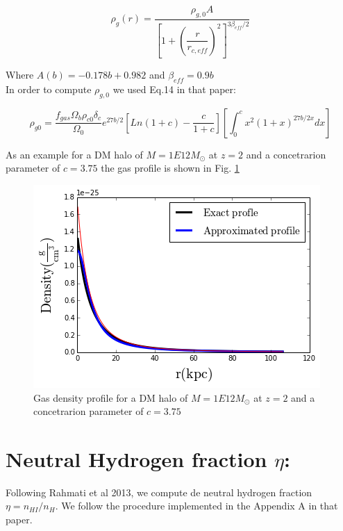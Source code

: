 \documentclass[12pt]{article}
\begin{document}
\begin{equation}\label{eq:rhogr}
\rho_g(r) =  \dfrac{\rho_{g,0}A}{\left[ 1 + \left(\dfrac{r}{r_{c,eff}}\right)^2 \right]^{3\beta_{eff}/2}}
\end{equation}

Where $A(b) = -0.178b + 0.982$ and $\beta_{eff} = 0.9 b$\\

In order to compute $\rho_{g,0}$ we used Eq.14 in that paper:

\begin{equation}\label{eq:rhog0}
\rho_{g0} = \dfrac{f_{gas}\Omega_{b}\rho_{c0}\delta_{c}}{\Omega_0}e^{27b/2} \left [ Ln(1+c) - \dfrac{c}{1+c}  \right ] \left [ \int_0^c x^2(1+x)^{27b/2x} dx \right ]
\end{equation}

As an example for a DM  halo of $M = 1E12 M_{\odot}$ at $z=2$ and a concetrarion parameter of $c=3.75$
the gas profile is shown in Fig. \ref{fig:gp}

\begin{figure}\label{fig:gp}
\centering
\includegraphics[scale=0.7]{../code/gasprofile.png}
\caption{Gas density profile for a DM  halo of $M = 1E12 M_{\odot}$ at $z=2$ and a concetrarion parameter of $c=3.75$}
\end{figure} 

\section{Neutral Hydrogen fraction $\eta$:}

Following Rahmati et al 2013, we compute de neutral hydrogen fraction $\eta = n_{HI} / n_H$. We follow
the procedure implemented in the Appendix A in that paper.\\
\end{document}

